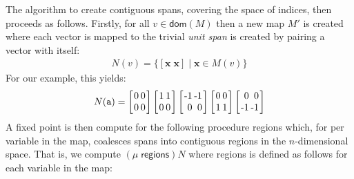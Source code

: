 \documentclass[9pt]{sigplanconf}
\theoremstyle{definition}
\newcommand{\vect}[1]{\textbf{#1}}
\newcommand{\vtwo}[2]{\setlength{\arraycolsep}{0em}
\left[\begin{array}{l}$#1$\\$#2$\end{array}\right]}
\newcommand{\stwo}[4]
{\setlength{\arraycolsep}{0.1em}
\left[\begin{array}{rr}$#1$ & $#3$\\$#2$ & $#4$\end{array}\right]}
\begin{document}
The algorithm to create contiguous spans, covering the space of
indices, then proceeds as follows.
Firstly, for all $v \in \mathsf{dom}(M)$ then a new map $M'$ is
created where each vector is mapped to the trivial \emph{unit span} is
created by pairing a vector with itself:
%
\begin{align*}
N(v) = \{[\vect{x} \;
  \vect{x}] \mid \vect{x} \in M(v)\}
\end{align*}
%
For our example, this yields:
\begin{align*}
N(\texttt{a}) = \stwo{0}{0}{0}{0} \stwo{1}{0}{1}{0} \stwo{-1}{0}{-1}{0} \stwo{0}{1}{0}{1} \stwo{0}{-1}{0}{-1}
\end{align*}
A fixed point is then compute for the following
procedure \textsf{regions} which, for per variable
in the map, coalesces spans into contiguous regions in
the $n$-dimensional space. That is, we compute
 $(\mu \; \textsf{regions}) N$ where \textsf{regions}
is defined as follows for each variable in the map:
%
\end{document}
